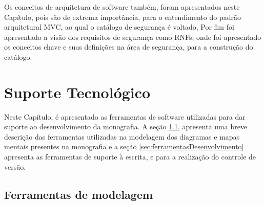 Os conceitos de arquitetura de software também, foram apresentados neste Capítulo, pois são de extrema importância, para o entendimento do padrão arquitetural MVC, ao qual o catálogo de segurança é voltado, Por fim foi apresentado a visão dos requisitos de segurança como RNFs, onde foi apresentado os conceitos chave e suas definições na área de segurança, para a construção do catálogo. 



\chapter{Suporte Tecnológico}
\label{chap:suporteTecnologico}

Neste Capítulo, é apresentado as ferramentas de software utilizadas para dar suporte ao desenvolvimento da monografia. A seção \ref{sec:ferramentasModelagem}, apresenta uma breve descrição das ferramentas utilizadas na modelagem dos diagramas e mapas mentais presentes na monografia e a seção \ref{sec:ferramentasDesenvolvimento} apresenta as ferramentas de suporte à escrita, e para a realização do controle de versão. 

\section{Ferramentas de modelagem}
\label{sec:ferramentasModelagem}

